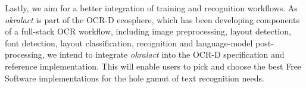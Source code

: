 \documentclass[conference]{IEEEtran}
\begin{document}


Lastly, we aim for a better integration of training and
recognition workflows. As \textit{okralact} is part of the OCR-D
ecosphere, which has been developing components of a full-stack
OCR workflow, including image preprocessing, layout detection, font
detection, layout classification, recognition and language-model
post-processing, we intend to integrate \textit{okralact} into the
OCR-D specification and reference implementation. This will enable
users to pick and choose the best Free Software implementations for
the hole gamut of text recognition needs.




%
%
%



\end{document}
